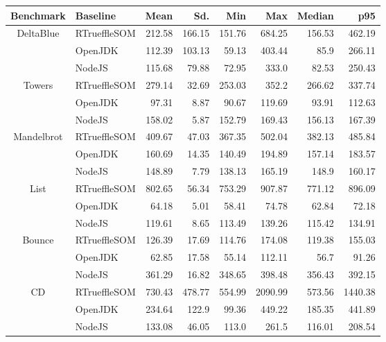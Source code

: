 \begin{center}
\begin{tabular}{ c | l r r r r r r}
\toprule
\textbf{Benchmark} & \textbf{Baseline} & \textbf{Mean} & \textbf{Sd.} & \textbf{Min} & \textbf{Max} & \textbf{Median} & \textbf{p95}\\
\toprule

\multirow{3}{*}{ DeltaBlue } & RTrueffleSOM & 212.58 & 166.15 & 151.76 & 684.25 & 156.53 & 462.19 \\
& OpenJDK & 112.39 & 103.13 & 59.13 & 403.44 & 85.9 & 266.11 \\
& NodeJS & 115.68 & 79.88 & 72.95 & 333.0 & 82.53 & 250.43 \\
\midrule

\multirow{3}{*}{ Towers } & RTrueffleSOM & 279.14 & 32.69 & 253.03 & 352.2 & 266.62 & 337.74 \\
& OpenJDK & 97.31 & 8.87 & 90.67 & 119.69 & 93.91 & 112.63 \\
& NodeJS & 158.02 & 5.87 & 152.79 & 169.43 & 156.13 & 167.39 \\
\midrule

\multirow{3}{*}{ Mandelbrot } & RTrueffleSOM & 409.67 & 47.03 & 367.35 & 502.04 & 382.13 & 485.84 \\
& OpenJDK & 160.69 & 14.35 & 140.49 & 194.89 & 157.14 & 183.57 \\
& NodeJS & 148.89 & 7.79 & 138.13 & 165.19 & 148.9 & 160.17 \\
\midrule

\multirow{3}{*}{ List } & RTrueffleSOM & 802.65 & 56.34 & 753.29 & 907.87 & 771.12 & 896.09 \\
& OpenJDK & 64.18 & 5.01 & 58.41 & 74.78 & 62.84 & 72.18 \\
& NodeJS & 119.61 & 8.65 & 113.49 & 139.26 & 115.42 & 134.91 \\
\midrule

\multirow{3}{*}{ Bounce } & RTrueffleSOM & 126.39 & 17.69 & 114.76 & 174.08 & 119.38 & 155.03 \\
& OpenJDK & 62.85 & 17.58 & 55.14 & 112.11 & 56.7 & 91.26 \\
& NodeJS & 361.29 & 16.82 & 348.65 & 398.48 & 356.43 & 392.15 \\
\midrule

\multirow{3}{*}{ CD } & RTrueffleSOM & 730.43 & 478.77 & 554.99 & 2090.99 & 573.56 & 1440.38 \\
& OpenJDK & 234.64 & 122.9 & 99.36 & 449.22 & 185.35 & 441.89 \\
& NodeJS & 133.08 & 46.05 & 113.0 & 261.5 & 116.01 & 208.54 \\
\midrule


\end{tabular}
\end{center}
